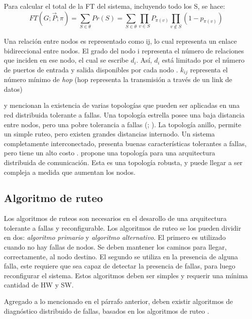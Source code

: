 Para calcular el total de la \ac{FT} del sistema, incluyendo todo los S, se hace: $$FT(G;\vec{P};\pi) = \sum_{S \in \theta}{Pr(S)} = \sum_{S \in \theta}{\prod_{v\in S}{P_{\pi (v)}} \prod_{v \notin S} (1-p_{\pi (v)})}$$

Una relación entre nodos es representado  como ij, lo cual representa un enlace bidireccional entre nodos. El grado del nodo i representa el número de relaciones que inciden en ese nodo, el cual se escribe $d_i$. Así, $d_i$ está limitado por el número de puertos de entrada y salida disponibles por cada nodo \citep{Pradhan82}. $k_{ij}$ representa el número mínimo de \textit{hop} (hop representa la transmisión a través de un link de datos) \citep{Pradhan82}

\cite{Stivaros92} y \cite{Pradhan82} mencionan la existencia de varias topologías que pueden ser aplicadas en una red distribuida tolerante a fallas. Una topología estrella posee una baja distancia entre nodos, pero una pobre tolerancia a fallas (\citep{Pradhan82}; \citep{Stivaros92}). La topología anillo, permite un simple ruteo, pero existen grandes distancias internodo. Un sistema completamente interconectado, presenta buenas características tolerantes a fallas, pero tiene un alto costo \citep{Pradhan82}. \cite{Pradhan82} propone una topología para una arquitectura distribuida de comunicación. Esta es una topología robusta, y puede llegar a ser compleja a medida que aumentan los nodos.

\subsection{Algoritmo de ruteo}
Los algoritmos de ruteos son necesarios en el desarollo de una arquitectura tolerante a fallas y reconfigurable. Los algoritmos de ruteo se los pueden dividir en dos: \textit{algoritmo primario} y \textit{algoritmo alternativo}. El primero es utilizado cuando no hay fallas de nodos. Se deben mantener los caminos para llegar, correctamente, al nodo destino. El segundo se utiliza en la presencia de alguna falla, este requiere que sea capaz de detectar la presencia de fallas, para luego reconfigurar el sistema. Estos algoritmos deben ser simples y requerir una mínima cantidad de \ac{HW} y \ac{SW}.

Agregado a lo mencionado en el párrafo anterior, deben existir algoritmos de diagnóstico distribuido de fallas, basados en los algoritmos de ruteo \citep{Pradhan82}.
